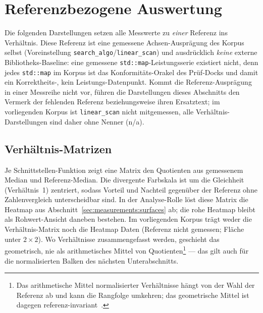 \section{Referenzbezogene Auswertung}\label{sec:measurements:reference}

Die folgenden Darstellungen setzen alle Messwerte zu \emph{einer} Referenz ins Verhältnis. Diese
Referenz ist eine gemessene Achsen-Ausprägung des Korpus selbst (Voreinstellung
\texttt{search\_algo}/\texttt{linear\_scan}) und ausdrücklich \emph{keine} externe
Bibliotheks-Baseline: eine gemessene \texttt{std::map}-Leistungsserie existiert nicht, denn jedes
\texttt{std::map} im Korpus ist das Konformitäts-Orakel des Prüf-Docks und damit ein
Korrektheits-, kein Leistungs-Datenpunkt. Kommt die Referenz-Ausprägung in einer Messreihe nicht
vor, führen die Darstellungen dieses Abschnitts den Vermerk der fehlenden Referenz beziehungsweise
ihren Ersatztext; im vorliegenden Korpus ist \texttt{linear\_scan} nicht mitgemessen, alle
Verhältnis-Darstellungen sind daher ohne Nenner (n/a).

\subsection{Verhältnis-Matrizen}\label{sec:measurements:ratio-matrices}

Je Schnittstellen-Funktion zeigt eine Matrix den Quotienten aus gemessenem Median und
Referenz-Median. Die divergente Farbskala ist um die Gleichheit (Verhältnis~1) zentriert, sodass
Vorteil und Nachteil gegenüber der Referenz ohne Zahlenvergleich unterscheidbar sind. In der
Analyse-Rolle löst diese Matrix die Heatmap aus Abschnitt~\ref{sec:measurements:surfaces} ab; die
rohe Heatmap bleibt als Rohwert-Ansicht daneben bestehen. Im vorliegenden Korpus trägt weder die
Verhältnis-Matrix noch die Heatmap Daten (Referenz nicht gemessen; Fläche unter
$2{\times}2$). Wo Verhältnisse zusammengefasst werden, geschieht das geometrisch, nie als
arithmetisches Mittel von Quotienten\footnote{Das arithmetische Mittel normalisierter Verhältnisse
hängt von der Wahl der Referenz ab und kann die Rangfolge umkehren; das geometrische Mittel ist
dagegen referenz-invariant~\cite{fleming1986statistics}.} --- das gilt auch für die normalisierten
Balken des nächsten Unterabschnitts.

